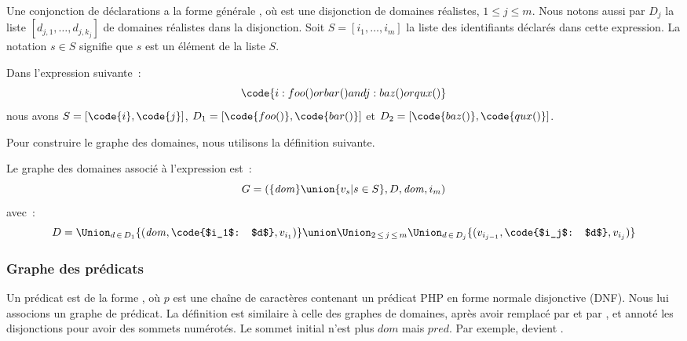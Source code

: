 Une conjonction de déclarations a la forme générale , où 
est une disjonction de domaines réalistes, $1 \leq j \leq m$. Nous notons aussi
par $D_j$ la liste $[d_{j,1}, \dots, d_{j,k_j}]$ de domaines réalistes dans la
disjonction. Soit $S = [i_1, \dots, i_m]$ la liste des identifiants déclarés
dans cette expression. La notation $s \in S$ signifie que $s$ est un élément de
la liste $S$.

\begin{example}
\label{example:test:expression_graph}

Dans l'expression suivante~:
%
$$\code{i: foo() or bar() and j: baz() or qux()}$$
%
nous avons $S = [\code{i}, \code{j}]$, $D_1 = [\code{foo()}, \code{bar()}]$ et
$D_2 = [\code{baz()}, \code{qux()}]$.

\end{example}

Pour construire le graphe des domaines, nous utilisons la définition suivante.

\begin{definition}

Le {\strong graphe des domaines} associé à l'expression  est~:
%
$$G = (\{\mathit{dom}\} \union \{v_s \vert s \in S\}, D, \mathit{dom}, i_m)$$
%
avec~:
%
$$D = \Union_{d \,\in\, D_1} \{(\mathit{dom}, \code{$i_1$: $d$}, v_{i_1})\} \union
      \Union_{2 \,\leq\, j \,\leq\, m}
      \Union_{d \,\in\, D_j} \{(v_{i_{j - 1}}, \code{$i_j$: $d$}, v_{i_{j}})\}$$

\end{definition}

\subsubsection{Graphe des prédicats}

Un prédicat est de la forme , où $p$ est une chaîne de caractères
contenant un prédicat PHP en forme normale disjonctive (DNF). Nous lui associons
un {\strong graphe de prédicat}. La définition est similaire à celle des graphes
de domaines, après avoir remplacé \code{\&\&} par  et \code{||} par
, et annoté les disjonctions pour avoir des sommets numérotés. Le
sommet initial n'est plus $\mathit{dom}$ mais $\mathit{pred}$. Par exemple,
 devient .

